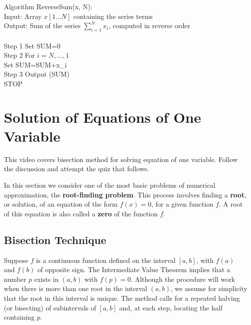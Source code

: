 \begin{myexercise}
\begin{mysolution}
\begin{enumerate}[label=(\alph*)]
\begin{boxB}
Algorithm ReverseSum(x, N):\\
Input: Array $x[1\ldots N]$ containing the series terms\\
Output: Sum of the series $\sum_{i=1}^N x_i$, computed in reverse order\\
\\
Step 1 Set SUM=0\\
Step 2 For $i=N, \ldots, 1$\\
\hspace*{1cm} Set SUM=SUM+x\_i\\
Step 3 Output (SUM)\\
\hspace*{1cm} STOP
\end{boxB}
\end{enumerate}
\end{mysolution}
\end{myexercise}

\section{Solution of Equations of One Variable}
\videolesson
\begin{selfvideo}[2]
This video covers bisection method for solving equation of one variable. Follow the discussion and attempt the quiz that follows.
\end{selfvideo}
In this section we consider one of the most basic problems of numerical approximation, the {\bf root-finding problem}. This process involves finding a {\bf root}, or solution, of an equation of the form $f(x)=0$, for a given function $f$. A root of this equation is also called a {\bf zero} of the function $f$.

\subsection*{Bisection Technique}
Suppose $f$ is a continuous function defined on the interval $[a,b]$, with $f(a)$ and $f(b)$ of opposite sign. The Intermediate Value Theorem implies that a number $p$ exists in $(a,b)$ with $f(p) = 0$. Although the procedure will work when there is more than one root in the interval $(a, b)$, we assume for simplicity that the root in this interval is unique. The method calls for a repeated halving (or bisecting) of subintervals of $[a,b]$ and, at each step, locating the half containing $p$.

